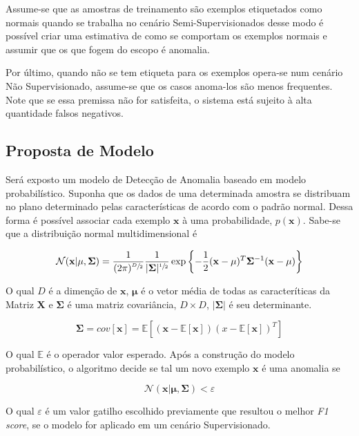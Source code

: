 Assume-se que as amostras de treinamento são exemplos etiquetados como normais quando se trabalha no cenário Semi-Supervisionados desse modo é possível criar uma estimativa de como se comportam os exemplos normais e assumir que os que fogem do escopo é anomalia.

Por último, quando não se tem etiqueta para os exemplos opera-se num cenário Não Supervisionado, assume-se que os casos anoma-los são menos frequentes. Note que se essa premissa não for satisfeita, o sistema está sujeito à alta quantidade falsos negativos.

\subsection{Proposta de Modelo}

Será exposto um modelo de Detecção de Anomalia baseado em modelo probabilístico. Suponha que os dados de uma determinada amostra se distribuam no plano determinado pelas características de acordo com o padrão normal. Dessa forma é possível associar cada exemplo \(\mathbf{x}\) à uma probabilidade, \(p(\mathbf{x})\).
Sabe-se\cite{bishop2006pattern} que a distribuição normal multidimensional é

\[\mathcal{N}(\mathbf{x}|\mathbf{\mu},\mathbf{\Sigma})=\frac{1}{(2\pi)^{\sfrac{D}{2}}} \frac{1}{|\mathbf{\Sigma}|^{\sfrac{1}{2}}}\exp\left\{ -\frac{1}{2} (\mathbf{x} - \mathbf{\mu})^T \mathbf{\Sigma}^{-1} (\mathbf{x} - \mathbf{\mu}) \right\}\]

O qual \(D\) é a dimenção de \(\mathbf{x}\), \(\mathbf{\mu}\) é o vetor média de todas as caracteríticas da Matriz \(\mathbf{X}\) e \(\mathbf{\Sigma}\) é uma matriz covariância, \(D \times D\), \(|\mathbf{\Sigma}|\) é seu determinante.

\[\mathbf{\Sigma}=\mathit{cov}[ \mathbf{x} ] = \mathbb{E} \left \lbrack ( \mathbf{x} - \mathbb{E} [ \mathbf{x} ] ) ( x - \mathbb{E} [ \mathbf{x} ] ) ^ T \right \rbrack \]

O qual \(\mathbb{E}\) é o operador valor esperado. Após a construção do modelo probabilístico, o algoritmo decide se tal um novo exemplo \(\mathbf{x}\) é uma anomalia se

\[\mathcal{N}(\mathbf{x}|\mathbf{\mu},\mathbf{\Sigma}) < \varepsilon\]

O qual \(\varepsilon\) é um valor gatilho escolhido previamente que resultou o melhor \textit{F1 score}, se o modelo for aplicado em um cenário Supervisionado.
